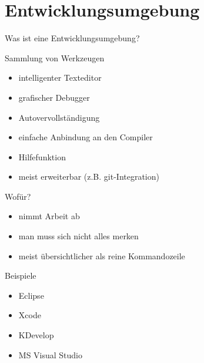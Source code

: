 \section{Entwicklungsumgebung}
\begin{frame}{Was ist eine Entwicklungsumgebung?}
	\begin{block}{Sammlung von Werkzeugen}
		\begin{itemize}
			\item intelligenter Texteditor
			\item grafischer Debugger
			\item Autovervollständigung
			\item einfache Anbindung an den Compiler
			\item Hilfefunktion
			\item meist erweiterbar (z.B. git-Integration)
		\end{itemize}
	\end{block}
\end{frame}

\begin{frame}{Wofür?}
	\begin{itemize}
		\item nimmt Arbeit ab
		\item man muss sich nicht alles merken
		\item meist übersichtlicher als reine Kommandozeile
	\end{itemize}
\end{frame}

\begin{frame}{Beispiele}
	\begin{itemize}
		\item Eclipse
		\item Xcode
		\item KDevelop
		\item MS Visual Studio
	\end{itemize}
\end{frame}